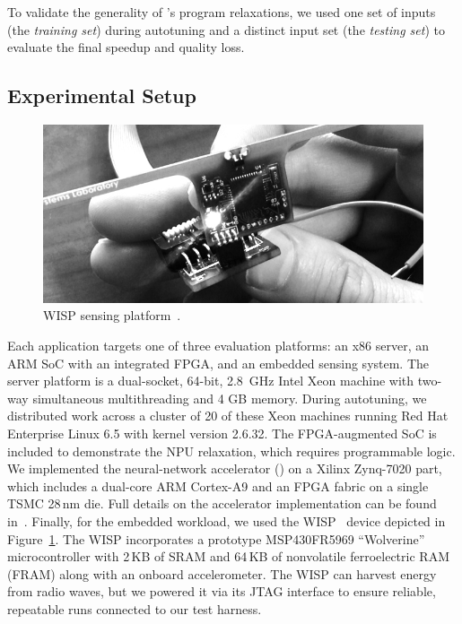 To validate the generality of \sysname's program relaxations, we used one set
of inputs (the \emph{training set}) during autotuning and a distinct input set
(the \emph{testing set}) to evaluate the final speedup and quality loss.

\subsection{Experimental Setup}

\begin{figure}
    \centering
    \includegraphics[width=0.8\linewidth]{figs/wisp.jpg}
    \vspace{-1ex}
    \caption{WISP sensing platform~\cite{wisp-transactions}.}
    \label{accept:fig:wispphoto}
\end{figure}

Each application targets one of three evaluation platforms: an x86 server,
an ARM SoC with an integrated FPGA, and an embedded sensing system.
The server platform is a dual-socket, 64-bit, 2.8~GHz Intel Xeon machine with
two-way simultaneous multithreading and 4 GB memory.
During autotuning, we distributed work across a cluster of 20 of these
Xeon machines running Red Hat Enterprise Linux 6.5 with kernel version 2.6.32.
The FPGA-augmented SoC is included to demonstrate the NPU relaxation, which
requires programmable logic.
We implemented the neural-network accelerator () on
a Xilinx Zynq-7020 part, which includes a dual-core ARM Cortex-A9 and an FPGA
fabric on a single TSMC 28\,nm die.
Full details on the accelerator implementation can be found in~\cite{snnap}.
Finally,
for the embedded  workload, we used the
WISP~\cite{wisp-transactions} device depicted in Figure~\ref{accept:fig:wispphoto}. The
WISP incorporates a prototype MSP430FR5969 ``Wolverine'' microcontroller with
2\,KB of SRAM and 64\,KB of nonvolatile ferroelectric RAM (FRAM) along with an
onboard accelerometer.  The WISP can harvest energy from radio waves, but we
powered it via its JTAG interface to ensure reliable, repeatable runs connected
to our test harness.

